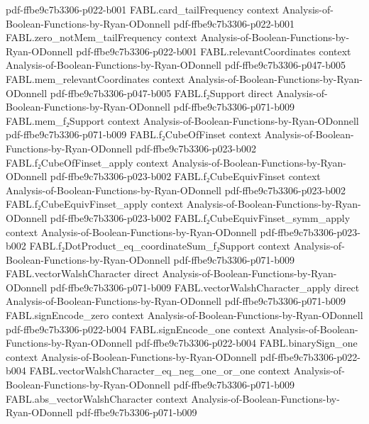 \begin{theorem}
  {pdf-ffbe9c7b3306-p022-b001}
\proofstep
  {FABL.card_tailFrequency}
  {context}
  {Analysis-of-Boolean-Functions-by-Ryan-ODonnell}
  {pdf-ffbe9c7b3306-p022-b001}
\proofstep
  {FABL.zero_notMem_tailFrequency}
  {context}
  {Analysis-of-Boolean-Functions-by-Ryan-ODonnell}
  {pdf-ffbe9c7b3306-p022-b001}
\proofstep
  {FABL.relevantCoordinates}
  {context}
  {Analysis-of-Boolean-Functions-by-Ryan-ODonnell}
  {pdf-ffbe9c7b3306-p047-b005}
\proofstep
  {FABL.mem_relevantCoordinates}
  {context}
  {Analysis-of-Boolean-Functions-by-Ryan-ODonnell}
  {pdf-ffbe9c7b3306-p047-b005}
\proofstep
  {FABL.f₂Support}
  {direct}
  {Analysis-of-Boolean-Functions-by-Ryan-ODonnell}
  {pdf-ffbe9c7b3306-p071-b009}
\proofstep
  {FABL.mem_f₂Support}
  {context}
  {Analysis-of-Boolean-Functions-by-Ryan-ODonnell}
  {pdf-ffbe9c7b3306-p071-b009}
\proofstep
  {FABL.f₂CubeOfFinset}
  {context}
  {Analysis-of-Boolean-Functions-by-Ryan-ODonnell}
  {pdf-ffbe9c7b3306-p023-b002}
\proofstep
  {FABL.f₂CubeOfFinset_apply}
  {context}
  {Analysis-of-Boolean-Functions-by-Ryan-ODonnell}
  {pdf-ffbe9c7b3306-p023-b002}
\proofstep
  {FABL.f₂CubeEquivFinset}
  {context}
  {Analysis-of-Boolean-Functions-by-Ryan-ODonnell}
  {pdf-ffbe9c7b3306-p023-b002}
\proofstep
  {FABL.f₂CubeEquivFinset_apply}
  {context}
  {Analysis-of-Boolean-Functions-by-Ryan-ODonnell}
  {pdf-ffbe9c7b3306-p023-b002}
\proofstep
  {FABL.f₂CubeEquivFinset_symm_apply}
  {context}
  {Analysis-of-Boolean-Functions-by-Ryan-ODonnell}
  {pdf-ffbe9c7b3306-p023-b002}
\proofstep
  {FABL.f₂DotProduct_eq_coordinateSum_f₂Support}
  {context}
  {Analysis-of-Boolean-Functions-by-Ryan-ODonnell}
  {pdf-ffbe9c7b3306-p071-b009}
\proofstep
  {FABL.vectorWalshCharacter}
  {direct}
  {Analysis-of-Boolean-Functions-by-Ryan-ODonnell}
  {pdf-ffbe9c7b3306-p071-b009}
\proofstep
  {FABL.vectorWalshCharacter_apply}
  {direct}
  {Analysis-of-Boolean-Functions-by-Ryan-ODonnell}
  {pdf-ffbe9c7b3306-p071-b009}
\proofstep
  {FABL.signEncode_zero}
  {context}
  {Analysis-of-Boolean-Functions-by-Ryan-ODonnell}
  {pdf-ffbe9c7b3306-p022-b004}
\proofstep
  {FABL.signEncode_one}
  {context}
  {Analysis-of-Boolean-Functions-by-Ryan-ODonnell}
  {pdf-ffbe9c7b3306-p022-b004}
\proofstep
  {FABL.binarySign_one}
  {context}
  {Analysis-of-Boolean-Functions-by-Ryan-ODonnell}
  {pdf-ffbe9c7b3306-p022-b004}
\proofstep
  {FABL.vectorWalshCharacter_eq_neg_one_or_one}
  {context}
  {Analysis-of-Boolean-Functions-by-Ryan-ODonnell}
  {pdf-ffbe9c7b3306-p071-b009}
\proofstep
  {FABL.abs_vectorWalshCharacter}
  {context}
  {Analysis-of-Boolean-Functions-by-Ryan-ODonnell}
  {pdf-ffbe9c7b3306-p071-b009}

\end{theorem}
